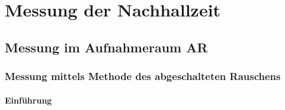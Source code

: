 \documentclass[11pt]{report}
\begin{document}


%

\newpage
\tableofcontents  

%




\listoffigures 


\pagestyle{headings}


\chapter{Messung der Nachhallzeit}
\section{Messung im Aufnahmeraum AR}
\subsection{Messung mittels Methode des abgeschalteten Rauschens}
\subsubsection{Einf\"uhrung}
\end{document}
